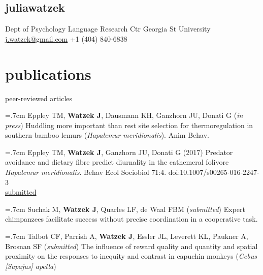 \documentclass[]{friggeri-cv}
\begin{document}
\begin{aside}
  \section{{\normalfont julia}watzek}
    Dept of Psychology
    Language Research Ctr
    Georgia St University
    ~
    \href{mailto:j.watzek@gmail.com}{j.watzek@gmail.com}
    +1 (404) 840-6838
\end{aside}


\section{publications}


{\subfont\large{} peer-reviewed articles}

\hangindent=.7cm Eppley TM, \textbf{Watzek J}, Dausmann KH, Ganzhorn JU, Donati G (\emph{in press}) Huddling more important than rest site selection for thermoregulation in southern bamboo lemurs (\emph{Hapalemur meridionalis}). Anim Behav.

\hangindent=.7cm Eppley TM, \textbf{Watzek J}, Ganzhorn JU, Donati G (2017) Predator avoidance and dietary fibre predict diurnality in the cathemeral folivore \emph{Hapalemur meridionalis}. Behav Ecol Sociobiol 71:4. doi:10.1007/s00265-016-2247-3 \\[-.1cm]


\hspace{.35cm} { \underline{submitted}}

\hangindent=.7cm Suchak M, \textbf{Watzek J}, Quarles LF, de Waal FBM (\emph{submitted}) Expert chimpanzees facilitate success without precise coordination in a cooperative task. 

\hangindent=.7cm Talbot CF, Parrish A, \textbf{Watzek J}, Essler JL, Leverett KL, Paukner A, Brosnan SF (\emph{submitted}) The influence of reward quality and quantity and spatial proximity on the responses to inequity and contrast in capuchin monkeys (\emph{Cebus [Sapajus] apella}) \\[-.1cm]
\end{document}
